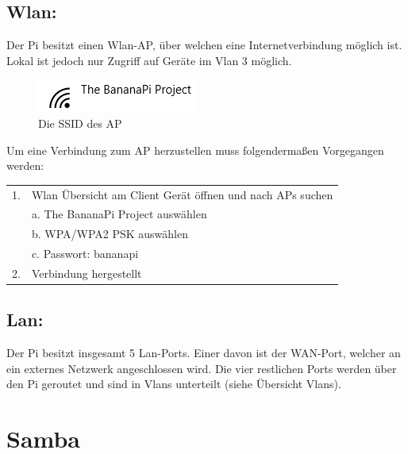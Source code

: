 \subsection*{Wlan:}
Der Pi besitzt einen Wlan-AP, über welchen eine Internetverbindung möglich ist. Lokal ist jedoch nur Zugriff auf Geräte im Vlan 3 möglich.
\begin{figure}[ht]
\includegraphics[width=.4\textwidth]{pictures/Jonas/Anleitung/BILD2}
\caption{Die SSID des AP}
\end{figure}
Um eine Verbindung zum AP herzustellen muss folgendermaßen Vorgegangen werden:\\
\begin{tabular}{l l}
1. & Wlan Übersicht am Client Gerät öffnen und nach APs suchen\\
   & a. The BananaPi Project auswählen\\
   & b. WPA/WPA2 PSK auswählen\\
   & c. Passwort: bananapi\\
2. & Verbindung hergestellt\\
\end{tabular}

\subsection*{Lan:}
Der Pi besitzt insgesamt 5 Lan-Ports. Einer davon ist der WAN-Port, welcher an ein externes Netzwerk angeschlossen wird. Die vier restlichen Ports werden über den Pi geroutet und sind in Vlans unterteilt (siehe Übersicht Vlans).

\section{Samba}
